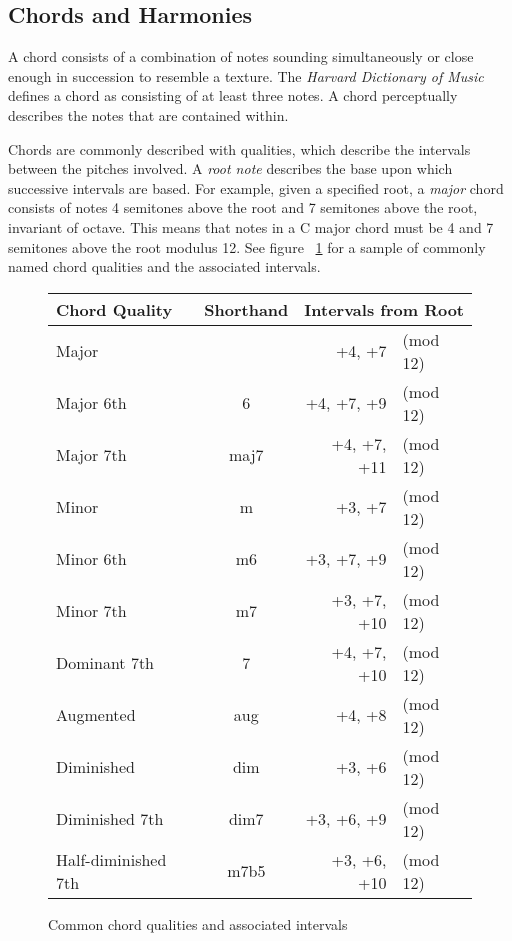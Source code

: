 \subsection{Chords and Harmonies}

A chord consists of a combination of notes sounding simultaneously or close enough in succession to resemble a texture. The \textit{Harvard Dictionary of Music} defines a chord as consisting of at least three notes\cite{harvdict}. A chord perceptually describes the notes that are contained within.

Chords are commonly described with qualities, which describe the intervals between the pitches involved. A \textit{root note} describes the base upon which successive intervals are based. For example, given a specified root, a \textit{major} chord consists of notes 4 semitones above the root and 7 semitones above the root, invariant of octave. This means that notes in a C major chord must be 4 and 7 semitones above the root modulus 12. See figure ~\ref{fig:qualitytable} for a sample of commonly named chord qualities and the associated intervals.

\begin{figure}[h!]
\begin{center}
\begin{tabular}{lcrl}
\toprule
Chord Quality       & Shorthand & \multicolumn{2}{c}{Intervals from Root} \\
\midrule
Major               &           & +4, +7      & (mod 12)\\
Major 6th           & 6         & +4, +7, +9  & (mod 12)\\
Major 7th           & maj7      & +4, +7, +11 & (mod 12)\\
Minor               & m         & +3, +7      & (mod 12)\\
Minor 6th           & m6        & +3, +7, +9  & (mod 12)\\
Minor 7th           & m7        & +3, +7, +10 & (mod 12)\\
Dominant 7th        & 7         & +4, +7, +10 & (mod 12)\\
Augmented           & aug       & +4, +8      & (mod 12)\\
Diminished          & dim       & +3, +6      & (mod 12)\\
Diminished 7th      & dim7      & +3, +6, +9  & (mod 12)\\
Half-diminished 7th & m7b5      & +3, +6, +10 & (mod 12)\\
\bottomrule
\end{tabular}
\caption{Common chord qualities and associated intervals}
\label{fig:qualitytable}
\end{center}
\end{figure}

